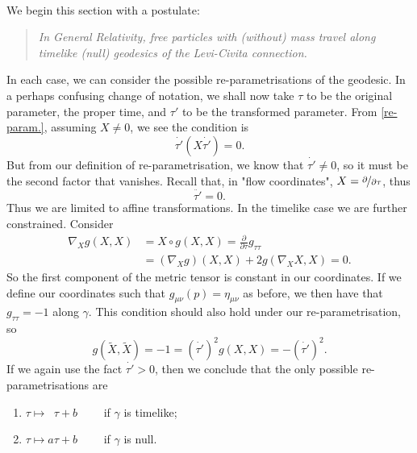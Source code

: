 \documentclass[11pt,fleqn]{report}
\begin{document}
\paragraph{}We begin this section with a postulate:
	\begin{quote}
		\textit{In General Relativity, free particles with (without) mass travel along timelike (null) geodesics of the Levi-Civita connection.}
	\end{quote}
In each case, we can consider the possible re-parametrisations of the geodesic. In a perhaps confusing change of notation, we shall now take $\tau$ to be the original parameter, the proper time, and $\tau'$ to be the transformed parameter. From \eqref{re-param.}, assuming $X \neq 0$, we see the condition is
	\begin{equation}
		\dot{\tau'}(X\dot{\tau'}) = 0.
	\end{equation}
But from our definition of re-parametrisation, we know that $\dot{\tau'} \neq 0$, so it must be the second factor that vanishes. Recall that, in "flow coordinates", $X = \nicefrac{\partial}{\partial \tau}$, thus
	\begin{equation}
		\ddot{\tau'} = 0.
	\end{equation}
Thus we are limited to affine transformations. In the timelike case we are further constrained. Consider
	\begin{align}
		\nabla_X g(X,X) &= X \circ g(X,X) = \frac{\partial}{\partial \tau} g_{\tau\tau} \\
		&= (\nabla_Xg)(X,X) + 2g(\nabla_X X,X) = 0.
	\end{align}
So the first component of the metric tensor is constant in our coordinates. If we define our coordinates such that $g_{\mu\nu}(p) = \eta_{\mu\nu}$ as before, we then have that $g_{\tau\tau} = -1$ along $\gamma$. This condition should also hold under our re-parametrisation, so
	\begin{equation}
		g(\widetilde{X},\widetilde{X}) = -1 = (\dot{\tau'})^2g(X,X) = -(\dot{\tau'})^2.
	\end{equation}
If we again use the fact $\dot{\tau'}>0$, then we conclude that the only possible re-parametrisations are
	\begin{enumerate}[label=(\roman*)]
		\item $\tau \mapsto \phantom a \tau + b \qquad$ if $\gamma$ is timelike;
		\item  $\tau \mapsto a\tau + b \qquad$ if $\gamma$ is null.
	\end{enumerate}
	
\end{document}
